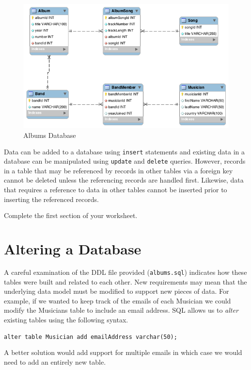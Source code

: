 \documentclass[12pt]{scrartcl}
\begin{document}
\begin{figure}[h]
\centering
\includegraphics[scale=.650]{images/albums}
\caption{Albums Database}
\label{figure:albumDB}
\end{figure}

Data can be added to a database using \texttt{insert} statements 
and existing data in a database can be manipulated using \texttt{update}
and \texttt{delete} queries.  However, records in a table that may be
referenced by records in other tables via a foreign key cannot be deleted
unless the referencing records are handled first.  Likewise, data that requires
a reference to data in other tables cannot be inserted prior to inserting the
referenced records.  

Complete the first section of your worksheet.

\section*{Altering a Database}

A careful examination of the DDL file provided (\texttt{albums.sql}) 
indicates how these tables were built and related to each other.  New 
requirements may mean that the underlying data model must be modified to 
support new pieces of data.  For example, if we wanted to keep track of the 
emails of each Musician we could modify the Musicians table to include an 
email address.  SQL allows us to \emph{alter} existing tables using
the following syntax.

\texttt{alter table Musician add emailAddress varchar(50);}

A better solution would add support for multiple emails in which case we 
would need to add an entirely new table.
\end{document}
